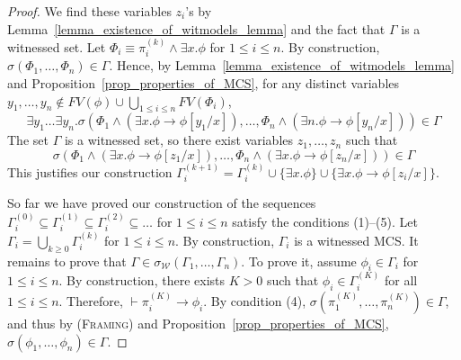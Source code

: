 \documentclass[acmsmall]{acmart}
\theoremstyle{acmdefinition}
\newcommand{\imp}{\to}
\newcommand{\Gammai}[1]{\Gamma_i^{(#1)}}
\newcommand{\WW}{\mathcal{W}}
\newcommand{\prule}[1]{\textsc{(#1)}}
\newcommand{\framing}{\prule{Framing}\xspace}
\newcommand{\fv}{\mathit{FV}}
\newcommand{\FV}{\fv}
\newcommand{\ddd}{,\dots,}
\newcommand{\sigmaMGammaoc}{\sigma_\WW}
\begin{document}
\begin{proof}
We find these variables $z_i$'s
by Lemma~\ref{lemma_existence_of_witmodels_lemma}
and the fact that $\Gamma$ is a witnessed set.
Let
$\Phi_i \equiv \pi_i^{(k)} \wedge  \exists x . \phi$
for $1 \le i \le n$.
By construction,
$\sigma(\Phi_1\ddd\Phi_n) \in \Gamma$.
Hence,
by Lemma~\ref{lemma_existence_of_witmodels_lemma}
and Proposition~\ref{prop_properties_of_MCS},
for any distinct variables 
$y_1 \ddd y_n \not\in
\FV(\phi)\cup
\bigcup_{1 \le i \le n} 
\FV(\Phi_i) 
$,
$$
\exists y_1 \dots \exists y_n .
\sigma(
\Phi_1 \wedge (\exists x . \phi \imp \phi[y_1/x])
\ddd
\Phi_n \wedge (\exists n . \phi \imp \phi[y_n/x])
) \in \Gamma
$$
The set $\Gamma$ is a witnessed set, 
so there exist variables $z_1 \ddd z_n$ such that
$$
\sigma(
\Phi_1
\wedge (\exists x . \phi \imp \phi[z_1/x])
\ddd
\Phi_n
\wedge (\exists x . \phi \imp \phi[z_n/x])
) \in \Gamma
$$
This justifies our construction
$\Gammai{k+1} = \Gammai{k} 
\cup \{ \exists x . \phi \}
\cup \{ \exists x . \phi \imp \phi[z_i/x] \}
$.

So far we have proved our construction
of the sequences
$\Gammai{0} \subseteq \Gammai{1} \subseteq \Gammai{2} \subseteq \dots$ 
for $1 \le i \le n$
satisfy the conditions (1)--(5).
Let $\Gamma_i = \bigcup_{k \ge 0} \Gammai{k}$ for $1 \le i \le n$.
By construction, $\Gamma_i$ is a witnessed MCS.
It remains to prove that
$\Gamma \in \sigmaMGammaoc(\Gamma_1 \ddd \Gamma_n)$.
To prove it, assume
$\phi_i \in \Gamma_i$ for $1 \le i \le n$.
By construction, there exists $K > 0$ such that
$\phi_i \in \Gammai{K}$ for all $1 \le i \le n$.
Therefore, $\vdash \pi_i^{(K)} \imp \phi_i$.
By condition (4), 
$\sigma(\pi_1^{(K)} \ddd \pi_n^{(K)}) \in \Gamma$,
and thus by \framing and Proposition~\ref{prop_properties_of_MCS},
$\sigma(\phi_1 \ddd \phi_n) \in \Gamma$.
\end{proof}
\end{document}
